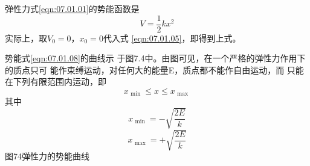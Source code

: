弹性力\lhbrak 式\eqref{eqn:07.01.01}\rhbrak 的势能函数是
\begin{equation}\label{eqn:07.01.08}
	V = \frac { 1 } { 2 } k x ^ { 2 }
\end{equation}
实际上，取$  V _ { 0 } = 0   $，$  x _ { 0 } = 0   $代入式
\eqref{eqn:07.01.05}，即得到上式。

势能\lhbrak 式\eqref{eqn:07.01.08}\rhbrak 的曲线示
于图7.4中。由图可见，在一个严格的弹性力作用下的质点只可
能作束缚运动，对任何大的能量E，质点都不能作自由运动，而
只能在下列有限范围内运动，即
{\setlength{\mathindent}{4em}
\begin{equation*}
	x _ { \text { min } } \leqslant x \leqslant x _ { \text { max } }
\end{equation*}
其中
\begin{equation*}
	x _ { \text { min } } = - \sqrt { \frac { 2 E } { k } }
\end{equation*}
\begin{equation*}
	x _ { \text { max } } = + \sqrt { \frac { 2 E } { k } }
\end{equation*}}
图74弹性力的势能曲线